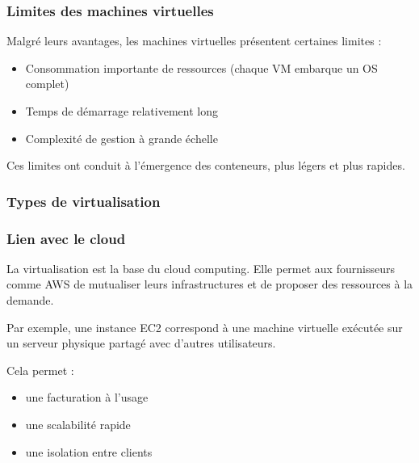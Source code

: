 \documentclass{rapportClass} %
\begin{document}
\subsubsection{Limites des machines virtuelles}

Malgré leurs avantages, les machines virtuelles présentent certaines limites :

\begin{itemize}
  \item Consommation importante de ressources (chaque VM embarque un OS complet)
  \item Temps de démarrage relativement long
  \item Complexité de gestion à grande échelle
\end{itemize}

Ces limites ont conduit à l’émergence des conteneurs, plus légers et plus rapides.

\subsubsection{Types de virtualisation}



\subsubsection{Lien avec le cloud}

La virtualisation est la base du cloud computing. Elle permet aux fournisseurs comme AWS de mutualiser leurs infrastructures et de proposer des ressources à la demande.

Par exemple, une instance EC2 correspond à une machine virtuelle exécutée sur un serveur physique partagé avec d’autres utilisateurs.

Cela permet :
\begin{itemize}
\item une facturation à l’usage
\item une scalabilité rapide
\item une isolation entre clients
\end{itemize}
\end{document}
